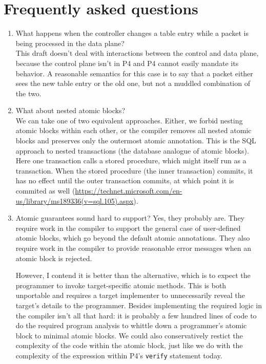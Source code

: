 \section{Frequently asked questions}
\label{s:faq}

\begin{enumerate}
\item What happens when the controller changes a table entry while a packet is
being processed in the data plane? \\
This draft doesn't deal with interactions between the control and data plane,
because the control plane isn't in P4 and P4 cannot easily mandate its
behavior. A reasonable semantics for this case is to say that a packet either
sees the new table entry or the old one, but not a muddled combination of the
two.

\item What about nested atomic blocks?\\
We can take one of two equivalent approaches. Either, we forbid nesting atomic
blocks within each other, or the compiler removes all nested atomic blocks and
preserves only the outermost atomic annotation. This is the SQL approach to
nested transactions (the database analogue of atomic blocks).  Here one
transaction calls a stored procedure, which might itself run as a transaction.
When the stored procedure (the inner transaction) commits, it has no effect
until the outer transaction commits, at which point it is commited as well
(\url{https://technet.microsoft.com/en-us/library/ms189336(v=sql.105).aspx}).

\item Atomic guarantees sound hard to support?
Yes, they probably are. They require work in the compiler to support the
general case of user-defined atomic blocks, which go beyond the default atomic
annotations. They also require work in the compiler to provide reasonable error
messages when an atomic block is rejected.

However, I contend it is better than the alternative, which is to expect the
programmer to invoke target-specific atomic methods. This is both unportable
and requires a target implementer to unnecessarily reveal the target's details
to the programmer. Besides implementing the required logic in the compiler
isn't all that hard: it is probably a few hundred lines of code to do the
required program analysis to whittle down a programmer's atomic block to
minimal atomic blocks. We could also conservatively restict the complexity of
the code within the atomic block, just like we do with the complexity of the
expression within P4's \texttt{verify} statement today.


\end{enumerate}
